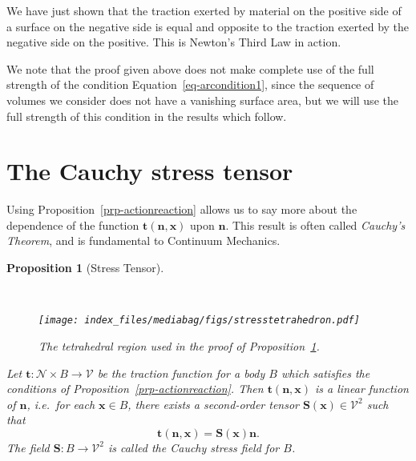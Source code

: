 \documentclass[
  letterpaper,
  DIV=11,
  numbers=noendperiod]{scrreprt}
\theoremstyle{plain}
\newtheorem{proposition}{Proposition}[chapter]
\theoremstyle{remark}
\begin{document}
We have just shown that the traction exerted by material on the positive
side of a surface on the negative side is equal and opposite to the
traction exerted by the negative side on the positive. This is Newton's
Third Law in action.

We note that the proof given above does not make complete use of the
full strength of the condition Equation~\ref{eq-arcondition1}, since the
sequence of volumes we consider does not have a vanishing surface area,
but we will use the full strength of this condition in the results which
follow.

\section{The Cauchy stress tensor}\label{the-cauchy-stress-tensor}

Using Proposition~\ref{prp-actionreaction} allows us to say more about
the dependence of the function
\({\boldsymbol{t}}({\boldsymbol{n}},{\boldsymbol{x}})\) upon
\({\boldsymbol{n}}\). This result is often called \emph{Cauchy's
Theorem}, and is fundamental to Continuum Mechanics.

\begin{proposition}[Stress
Tensor]\protect\hypertarget{prp-stresstensor}{}\label{prp-stresstensor}

~

\begin{figure}

{\centering \texttt{[image: index\_files/mediabag/figs/stresstetrahedron.pdf]}

}

\caption{The tetrahedral region used in the proof of
Proposition~\ref{prp-stresstensor}.}

\end{figure}%

Let \({\boldsymbol{t}}:{\mathcal{N}}\times B\to{\mathcal{V}}\) be the
traction function for a body \(B\) which satisfies the conditions of
Proposition~\ref{prp-actionreaction}. Then
\({\boldsymbol{t}}({\boldsymbol{n}},{\boldsymbol{x}})\) is a linear
function of \({\boldsymbol{n}}\), i.e.~for each
\({\boldsymbol{x}}\in B\), there exists a second-order tensor
\({\boldsymbol{S}}({\boldsymbol{x}})\in{\mathcal{V}}^2\) such that
\[{\boldsymbol{t}}({\boldsymbol{n}},{\boldsymbol{x}})= {\boldsymbol{S}}({\boldsymbol{x}}){\boldsymbol{n}}.\]
The field \({\boldsymbol{S}}:B\to{\mathcal{V}}^2\) is called the
\emph{Cauchy stress field} for \(B\).

\end{proposition}
\end{document}
